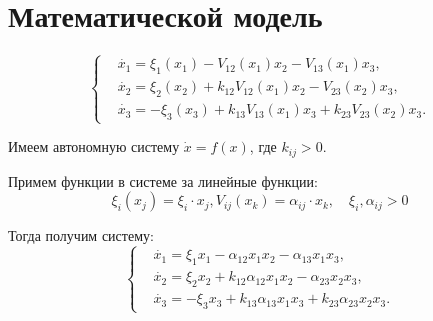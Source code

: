  \section{Математической модель}
    \[
        \left\{\begin{split}
            & \dot{x_1} = \xi_1(x_1) - V_{12}(x_1)x_2 - V_{13}(x_1)x_3, \\
            & \dot{x_2} = \xi_2(x_2) + k_{12} V_{12}(x_1)x_2 - V_{23}(x_2)x_3, \\
            & \dot{x_3} = -\xi_3(x_3) + k_{13} V_{13}(x_1)x_3 + k_{23} V_{23}(x_2)x_3. 
        \end{split}\right.
    \]
    
    Имеем автономную систему \( \dot{x} = f(x) \), где \( k_{ij} > 0 \).

    Примем функции в системе за линейные функции: 
    \[ \xi_i(x_j) = \xi_i \cdot x_j, V_{ij}(x_k) = \alpha_{ij} \cdot x_k, \quad \xi_i, \alpha_{ij} > 0 \]

    Тогда получим систему:
    \[
        \left\{\begin{split}
            & \dot{x_1} = \xi_1 x_1 - \alpha_{12} x_1 x_2 - \alpha_{13} x_1 x_3, \\
            & \dot{x_2} = \xi_2 x_2 + k_{12} \alpha_{12} x_1 x_2 - \alpha_{23} x_2 x_3, \\
            & \dot{x_3} = -\xi_3 x_3 + k_{13} \alpha_{13} x_1 x_3 + k_{23} \alpha_{23} x_2 x_3. 
        \end{split}\right.
    \]
